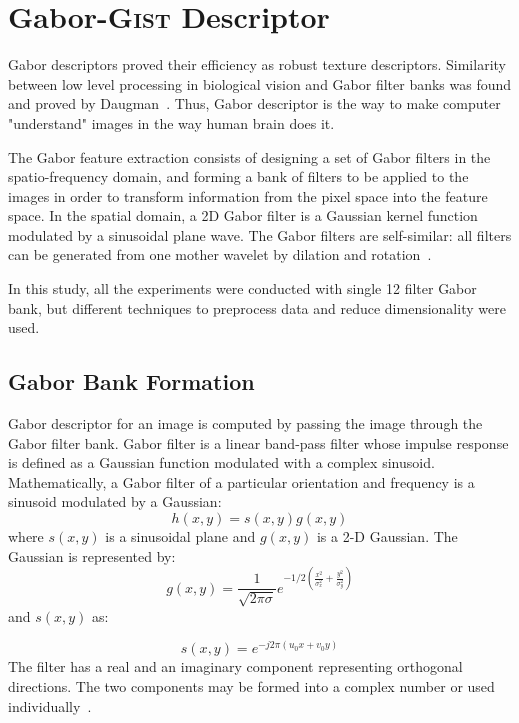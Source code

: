 \documentclass[%
	final,
	narroweqnarray,
	notitlepage,
	inline,
	twoside,
	]{ieee}
\begin{document}
\section{Gabor-\textsc{Gist} Descriptor}
\label{sec:Gabor}
Gabor descriptors proved their efficiency as robust texture descriptors. Similarity between low level processing in biological vision and Gabor ﬁlter banks was found and proved by Daugman~\cite{daugman}. Thus, Gabor descriptor is the way to make computer "understand" images in the way human brain does it.

The Gabor feature extraction consists of designing a set of Gabor filters in the spatio-frequency domain, and  forming a bank of filters to be applied to the images in order to transform information from the pixel space into the feature space. In the spatial domain, a 2D Gabor filter is a Gaussian kernel function modulated by a sinusoidal plane wave. The Gabor filters are self-similar: all filters can be generated from one mother wavelet by dilation and rotation~\cite{bib:Gist4}.

In this study, all the experiments were conducted with single 12 filter Gabor bank, but different techniques to preprocess data and reduce dimensionality were used.
\subsection{Gabor Bank Formation}
\label{subsec:Gab_Bank}
Gabor descriptor for an image is computed by passing the image through the Gabor ﬁlter bank. Gabor ﬁlter is a linear band-pass ﬁlter whose impulse response is defined as a Gaussian function modulated with a complex sinusoid.
Mathematically, a Gabor filter of a particular orientation and frequency is a sinusoid modulated by a Gaussian:
 \begin{displaymath}
h(x,y) = s(x,y)g(x,y)
\end{displaymath}
where $s(x, y)$ is a sinusoidal plane and $g(x, y)$ is a 2-D Gaussian. The Gaussian is represented by:
\begin{displaymath}
g(x,y) = \frac{1}{{\sqrt{2\pi\sigma}}}e^{-1/2(\frac{x^2}{\sigma_x^2} + \frac{y^2}{\sigma_y^2})}
\end{displaymath}
and $s(x,y)$ as:

\begin{displaymath}
s(x,y) = e^{-j2\pi(u_0x + v_0y)}
\end{displaymath}
The filter has a real and an imaginary component representing orthogonal directions. The two components may be formed into a complex number or used individually~\cite{bib:Gist2}.\\
\end{document}
